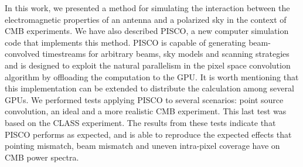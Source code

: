 \documentclass[a4paper,11pt]{article}
\begin{document}
In this work, we presented a method for simulating the interaction between the electromagnetic properties of an antenna and a polarized sky in the context of CMB experiments. We have also described PISCO, a new computer simulation code that implements this method. PISCO is capable of generating beam-convolved timestreams for arbitrary beams, sky models and scanning strategies and is designed to exploit the natural parallelism in the pixel space convolution algorithm by offloading the computation to the GPU. It is worth mentioning that this implementation can be extended to distribute the calculation among several GPUs. We performed tests applying PISCO to several scenarios: point source convolution, an ideal and a more realistic CMB experiment. This last test was based on the CLASS experiment. The results from these tests indicate that PISCO performs as expected, and is able to reproduce the expected effects that pointing mismatch, beam mismatch and uneven intra-pixel coverage have on CMB power spectra.





\appendix
\end{document}
